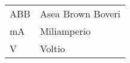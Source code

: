 \chapter*{\notationname}
\pagestyle{especial}
\chaptermark{\notationname}
{}
\begin{longtable}{p{3cm}p{8.5cm}}

ABB & Asea Brown Boveri \\

mA & Miliamperio \\
V & Voltio \\



\end{longtable}
